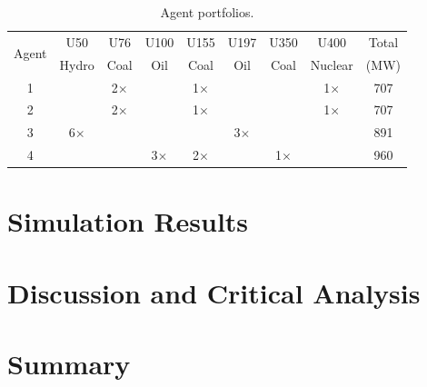 \begin{table}
\begin{center}

\begin{tabular}{c|c|c|c|c|c|c|c|c}
\hline
\multirow{2}{*}{Agent} &U50 &U76 &U100 &U155 &U197 &U350 &U400 &Total \\
 &Hydro &Coal &Oil &Coal &Oil &Coal &Nuclear &(MW) \\
\hline
1 & &2$\times$ & &1$\times$ & & &1$\times$ &707 \\
2 & &2$\times$ & &1$\times$ & & &1$\times$ &707 \\
3 &6$\times$ & & & &3$\times$ & & &891 \\
4 & & &3$\times$ &2$\times$ & &1$\times$ & &960 \\
\hline
\end{tabular}

\caption{Agent portfolios.}
\label{tbl:agent_portfolios}
\end{center}
\end{table}


\section{Simulation Results}
\section{Discussion and Critical Analysis}
\label{sec:discuss}
\section{Summary}
